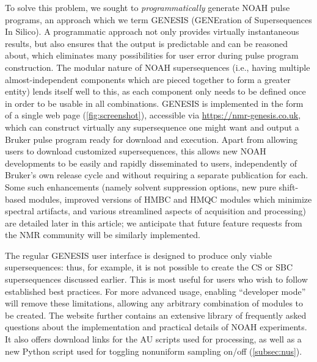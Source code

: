 \documentclass[a4paper,11pt]{article}
\newcommand{\theurl}{\url{https://nmr-genesis.co.uk}}
\begin{document}
\begin{refsection}
To solve this problem, we sought to \textit{programmatically} generate NOAH pulse programs, an approach which we term GENESIS (GENEration of Supersequences In Silico).
A programmatic approach not only provides virtually instantaneous results, but also ensures that the output is predictable and can be reasoned about, which eliminates many possibilities for user error during pulse program construction.
The modular nature of NOAH supersequences (i.e., having multiple almost-independent components which are pieced together to form a greater entity) lends itself well to this, as each component only needs to be defined once in order to be usable in all combinations.
GENESIS is implemented in the form of a single web page (\cref{fig:screenshot}), accessible via \theurl{}, which can construct virtually any supersequence one might want and output a Bruker pulse program ready for download and execution.
Apart from allowing users to download customized supersequences, this allows new NOAH developments to be easily and rapidly disseminated to users, independently of Bruker's own release cycle and without requiring a separate publication for each.
Some such enhancements (namely solvent suppression options, new pure shift-based modules, improved versions of HMBC and HMQC modules which minimize spectral artifacts, and various streamlined aspects of acquisition and processing) are detailed later in this article; we anticipate that future feature requests from the NMR community will be similarly implemented.

The regular GENESIS user interface is designed to produce only viable supersequences: thus, for example, it is not possible to create the CS or SBC supersequences discussed earlier.
This is most useful for users who wish to follow established best practices.
For more advanced usage, enabling ``developer mode'' will remove these limitations, allowing any arbitrary combination of modules to be created.
The website further contains an extensive library of frequently asked questions about the implementation and practical details of NOAH experiments.
It also offers download links for the AU scripts used for processing, as well as a new Python script used for toggling nonuniform sampling on/off (\cref{subsec:nus}).



\end{refsection}
\end{document}
